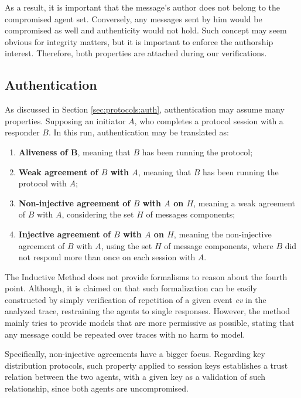 As a result, it is important that the message's author does not belong to the compromised agent set. Conversely, any messages sent by him would be compromised as well and authenticity would not hold. Such concept may seem obvious for integrity matters, but it is important to enforce the authorship interest. Therefore, both properties are attached during our verifications.



\subsection{Authentication}
As discussed in Section \ref{sec:protocols:auth}, authentication may assume many properties. Supposing an initiator $A$, who completes a protocol session with a responder $B$. In this run, authentication may be translated as:

\begin{enumerate}
  \item \textbf{Aliveness of B}, meaning that $B$ has been running the protocol;
  \item \textbf{Weak agreement of $B$ with $A$}, meaning that $B$ has been running the protocol with $A$;
  \item \textbf{Non-injective agreement of $B$ with $A$ on $H$}, meaning a weak agreement of $B$ with $A$, considering the set $H$ of messages components;
  \item \textbf{Injective agreement of $B$ with $A$ on $H$}, meaning the non-injective agreement of $B$ with $A$, using the set $H$ of message components, where $B$ did not respond more than once on each session with $A$.
\end{enumerate}

The Inductive Method does not provide formalisms to reason about the fourth point. Although, it is claimed on \cite{Bella2007} that such formalization can be easily constructed by simply verification of repetition of a given event \textit{ev} in the analyzed trace, restraining the agents to single responses. However, the method mainly tries to provide models that are more permissive as possible, stating that any message could be repeated over traces with no harm to model.

Specifically, non-injective agreements have a bigger focus. Regarding key distribution protocols, such property applied to session keys establishes a trust relation between the two agents, with a given key as a validation of such relationship, since both agents are uncompromised.

